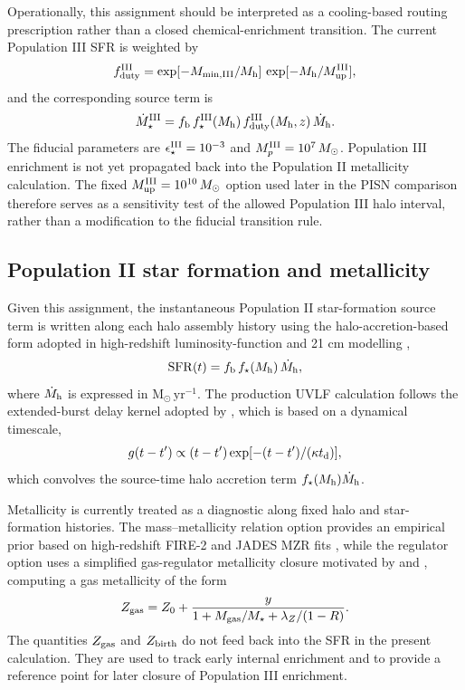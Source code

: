 \documentclass[twocolumn,times]{aastex701}
\begin{document}
Operationally, this assignment should be interpreted as a cooling-based routing prescription rather than a closed chemical-enrichment transition. The current Population III SFR is weighted by
\begin{equation}
  f_{\rm duty}^{\rm III}
  = \exp[-M_{\rm min,III}/M_{\rm h}]\,
    \exp[-M_{\rm h}/M_{\rm up}^{\rm III}],
\end{equation}
and the corresponding source term is
\begin{equation}
  \dot M_\star^{\rm III}
  =
  f_{\rm b}\,f_\star^{\rm III}(M_{\rm h})\,
  f_{\rm duty}^{\rm III}(M_{\rm h},z)\,
  \dot{M}_{\rm h} .
\end{equation}
The fiducial parameters are $\epsilon_\star^{\rm III}=10^{-3}$ and $M_p^{\rm III}=10^7\,M_\odot$. Population III enrichment is not yet propagated back into the Population II metallicity calculation. The fixed $M_{\rm up}^{\rm III}=10^{10}\,M_\odot$ option used later in the PISN comparison therefore serves as a sensitivity test of the allowed Population III halo interval, rather than a modification to the fiducial transition rule.

\subsection{Population II star formation and metallicity}\label{subsec:popii}

Given this assignment, the instantaneous Population II star-formation source term is written along each halo assembly history using the halo-accretion-based form adopted in high-redshift luminosity-function and 21 cm modelling \citep{Sun2016,Mirocha2017},
\begin{equation}
  \mathrm{SFR}(t) = f_{\rm b}\, f_\star(M_{\rm h})\,\dot{M}_{\rm h},
\end{equation}
where $\dot{M}_{\rm h}$ is expressed in $\mathrm{M}_\odot\,\mathrm{yr}^{-1}$. The production UVLF calculation follows the extended-burst delay kernel adopted by \citet{Yue2016}, which is based on a dynamical timescale,
\begin{equation}
  g(t-t') \propto (t-t')\exp[-(t-t')/(\kappa t_{\rm d})],
\end{equation}
which convolves the source-time halo accretion term $f_\star(M_{\rm h})\dot{M}_{\rm h}$.

{\color{blue}
Metallicity is currently treated as a diagnostic along fixed halo and star-formation histories. The mass--metallicity relation option provides an empirical prior based on high-redshift FIRE-2 and JADES MZR fits \citep{Ma2016,Curti2024}, while the regulator option uses a simplified gas-regulator metallicity closure motivated by \citet{Lilly2013} and \citet{PengMaiolino2014}, computing a gas metallicity of the form
\begin{equation}
  Z_{\rm gas} = Z_0 +
  \frac{y}{1 + M_{\rm gas}/M_\star + \lambda_Z/(1-R)} .
\end{equation}
The quantities $Z_{\rm gas}$ and $Z_{\rm birth}$ do not feed back into the SFR in the present calculation. They are used to track early internal enrichment and to provide a reference point for later closure of Population III enrichment.
}
\end{document}
